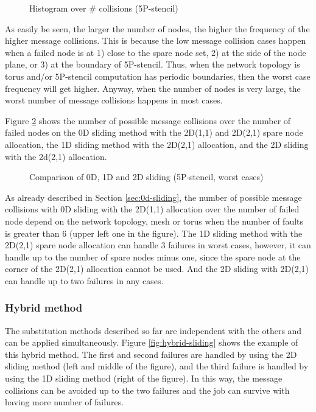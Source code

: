 \documentclass[10pt,conference,a4paper,fleqn]{IEEEtran}
\begin{document}
\begin{figure}[ht]
\begin{center}
  \caption{Histogram over \# collisions (5P-stencil)} 
  \label{fig:coll-hist}
\end{center}
\end{figure}

As easily be seen, the larger the number of nodes, the higher the
frequency of the higher message collisions. This is because the low
message collision cases happen when a failed node is at 1) close to
the spare node set, 2) at the side of the node plane, or 3) at the
boundary of 5P-stencil. Thus, when the network topology is torus
and/or 5P-stencil computation has periodic boundaries, then the worst 
case frequency will get higher. Anyway, when the number of nodes is
very large, the worst number of message collisions happens in most
cases. 

Figure \ref{fig:comparison} shows the number of possible message
collisions over the number of failed nodes on the 0D sliding method with
the 2D(1,1) and 2D(2,1) spare node allocation, the 1D sliding method with
the 2D(2,1) allocation, and the 2D sliding with the 2d(2,1) allocation. 

\begin{figure}[ht]
\begin{center}
  \caption{Comparison of 0D, 1D and 2D sliding (5P-stencil, worst cases)} 
  \label{fig:comparison}
\end{center}
\end{figure}

As already described in Section \ref{sec:0d-sliding}, the number of
possible message collisions with 0D sliding with the 2D(1,1)
allocation over the number of failed node depend on the network
topology, mesh or torus when the number of faults is greater than
6 (upper left one in the figure). The 1D sliding method with the 2D(2,1)
spare node allocation can handle 3 failures in worst cases, however,
it can handle up to the number of spare nodes minus one, since the
spare node at the corner of the 2D(2,1) allocation cannot be used. And
the 2D sliding with 2D(2,1) can handle up to two failures in any cases.

\subsubsection{Hybrid method}

The substitution methods described so far are independent with the
others and can be applied simultaneously. Figure \ref{fig:hybrid-sliding}
shows the example of this hybrid method. The first and second failures
are handled by using the 2D sliding method (left and middle of the
figure), and the third failure is handled by using the 1D sliding
method (right of the figure). In this way, the message collisions can
be avoided up to the two failures and the job can survive with having
more number of failures.
\end{document}
